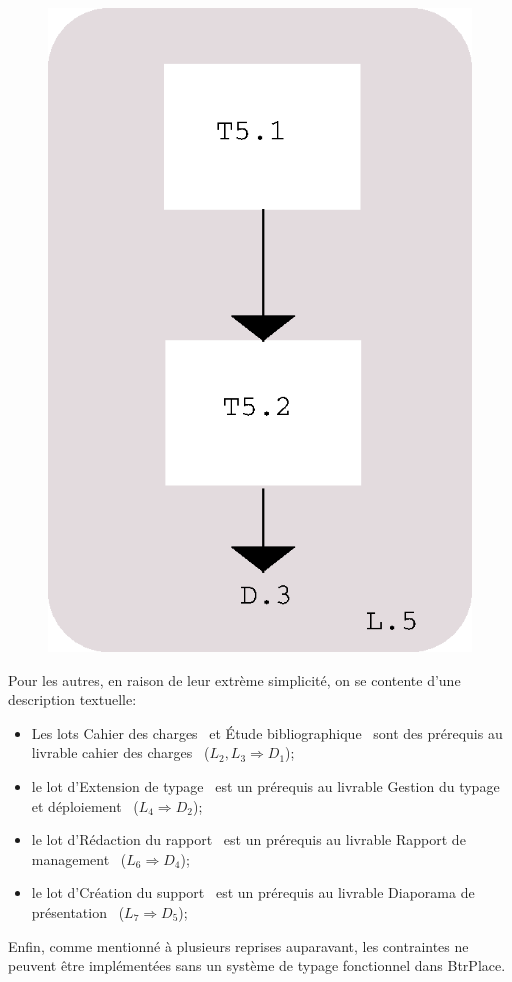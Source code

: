 \documentclass[a4paper]{article}
\begin{document}
\begin{figure}[!ht]
{		\includegraphics[scale=.45]{imgs/L5.eps}
	}
\end{figure}

Pour les autres, en raison de leur extrème simplicité, on se contente d'une
description textuelle:
\begin{itemize}
	\item Les lots \og Cahier des charges \fg\ et \og Étude bibliographique \fg\
		sont des prérequis au livrable \og cahier des charges \fg\ ($L_2, L_3
		\Rightarrow D_1$);
	\item le lot d'\og Extension de typage \fg\ est un prérequis au livrable
		\og Gestion du typage et déploiement \fg\ ($L_4 \Rightarrow D_2$);
	\item le lot d'\og Rédaction du rapport \fg\ est un prérequis au livrable
		\og Rapport de management \fg\ ($L_6 \Rightarrow D_4$);
	\item le lot d'\og Création du support \fg\ est un prérequis au livrable
		\og Diaporama de présentation \fg\ ($L_7 \Rightarrow D_5$);
\end{itemize}
Enfin, comme mentionné à plusieurs reprises auparavant, les contraintes ne peuvent
être implémentées sans un système de typage fonctionnel dans BtrPlace.
\end{document}
